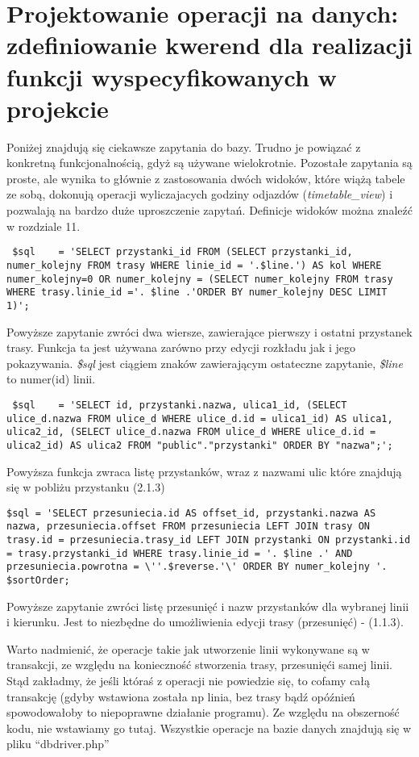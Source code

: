 \section{Projektowanie operacji na danych: zdefiniowanie kwerend dla realizacji funkcji wyspecyfikowanych w projekcie}
Poniżej znajdują się ciekawsze zapytania do bazy. Trudno je powiązać z konkretną funkcjonalnością, gdyż są używane wielokrotnie. Pozostałe zapytania są proste, ale wynika to głównie z zastosowania dwóch widoków, które wiążą tabele ze sobą, dokonują operacji wyliczajacych godziny odjazdów (\textit{timetable\_view}) i pozwalają na bardzo duże uproszczenie zapytań. Definicje widoków można znaleźć w rozdziale 11.
\begin{lstlisting}
 $sql    = 'SELECT przystanki_id FROM (SELECT przystanki_id, numer_kolejny FROM trasy WHERE linie_id = '.$line.') AS kol WHERE numer_kolejny=0 OR numer_kolejny = (SELECT numer_kolejny FROM trasy WHERE trasy.linie_id ='. $line .'ORDER BY numer_kolejny DESC LIMIT 1)';
\end{lstlisting}
Powyższe zapytanie zwróci dwa wiersze, zawierające pierwszy i ostatni przystanek trasy. Funkcja ta jest używana zarówno przy edycji rozkładu jak i jego pokazywania.
\textit{\$sql} jest ciągiem znaków zawierającym ostateczne zapytanie, \textit{\$line} to numer(id) linii.

\begin{lstlisting}
 $sql    = 'SELECT id, przystanki.nazwa, ulica1_id, (SELECT ulice_d.nazwa FROM ulice_d WHERE ulice_d.id = ulica1_id) AS ulica1, ulica2_id, (SELECT ulice_d.nazwa FROM ulice_d WHERE ulice_d.id = ulica2_id) AS ulica2 FROM "public"."przystanki" ORDER BY "nazwa";';
\end{lstlisting}
Powyższa funkcja zwraca listę przystanków, wraz z nazwami ulic które znajdują się w pobliżu przystanku (2.1.3)
\begin{lstlisting}
$sql = 'SELECT przesuniecia.id AS offset_id, przystanki.nazwa AS nazwa, przesuniecia.offset FROM przesuniecia LEFT JOIN trasy ON trasy.id = przesuniecia.trasy_id LEFT JOIN przystanki ON przystanki.id = trasy.przystanki_id WHERE trasy.linie_id = '. $line .' AND przesuniecia.powrotna = \''.$reverse.'\' ORDER BY numer_kolejny '. $sortOrder;
\end{lstlisting}
Powyższe zapytanie zwróci listę przesunięć i nazw przystanków dla wybranej linii i kierunku. Jest to niezbędne do umożliwienia edycji trasy (przesunięć) - (1.1.3).

Warto nadmienić, że operacje takie jak utworzenie linii wykonywane są w transakcji, ze względu na konieczność stworzenia trasy, przesunięći samej linii. Stąd zakładmy, że jeśli któraś z operacji nie powiedzie się, to cofamy całą transakcję (gdyby wstawiona została np linia, bez trasy bądź opóźnień spowodowałoby to niepoprawne działanie programu). Ze względu na obszerność kodu, nie wstawiamy go tutaj. Wszystkie operacje na bazie danych znajdują się w pliku ``dbdriver.php''

